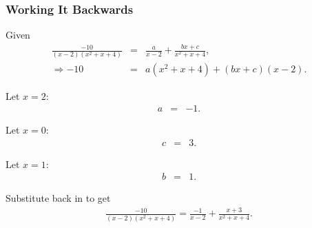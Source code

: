 \begin{frame}
  \frametitle{Working It Backwards}
  
  Given
  \begin{eqnarray*}
    \frac{-10}{(x-2)(x^2+x+4)} & = & \frac{a}{x-2} + \frac{bx+c}{x^2+x+4}, \\
    \Rightarrow -10 & = & a(x^2+x+4) + (bx+c)(x-2).
  \end{eqnarray*}

  {
    Let $x=2$:
    \begin{eqnarray*}
      a & = & -1.
    \end{eqnarray*}

    Let $x=0$:
    \begin{eqnarray*}
      c & = & 3.
    \end{eqnarray*}
 
    Let $x=1$:
    \begin{eqnarray*}
      b & = & 1.
    \end{eqnarray*}

    Substitute back in to get
    \begin{eqnarray*}
     \frac{-10}{(x-2)(x^2+x+4)}= \frac{-1}{x-2} + \frac{x+3}{x^2+x+4}. 
  \end{eqnarray*}

  }

\end{frame}


